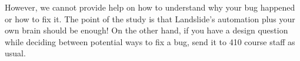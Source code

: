 \documentclass{article}
\begin{document}
\noindent However, we cannot provide help on how to understand why your bug happened or how to fix it. The point of
the study is that Landslide's automation plus your own brain should be enough! On the other hand, if you have
a design question while deciding between potential ways to fix a bug, send it to 410 course staff as usual.
\end{document}
